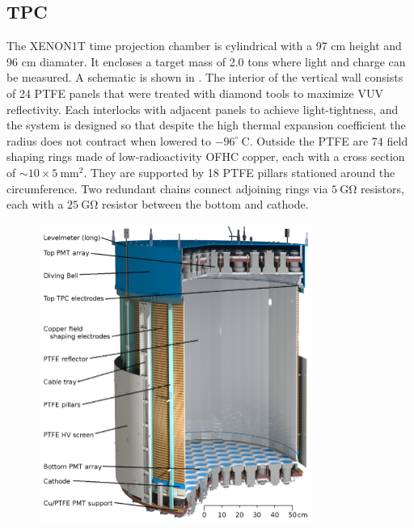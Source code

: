 \subsection{TPC}
\label{subsec:xenon1t_tpc}
The XENON1T time projection chamber is cylindrical with a 97 cm height and 96 cm diamater.  It encloses a target mass of 2.0 tons where
light and charge can be measured.  A schematic is shown in .  The interior of the vertical wall consists of 24
PTFE panels that were treated with diamond tools to
maximize VUV reflectivity.  Each interlocks with adjacent panels to achieve light-tightness, and the system is designed so that despite
the high thermal expansion coefficient the radius does not contract when lowered to $-96^{\circ}\ \mathrm{C}$.  Outside the PTFE are 74
field shaping rings made of low-radioactivity OFHC copper, each with a cross section of ${\sim} 10 \times 5\ \mathrm{mm^{2}}$.  They are
supported by 18 PTFE pillars stationed around the circumference.  Two redundant
chains connect adjoining rings via $5\ \mathrm{G \Omega}$ resistors, each with a $25\ \mathrm{G \Omega}$ resistor between the bottom and
cathode.

\begin{figure}
\centering
\includegraphics[width=0.8\textwidth]{XENON1TTPC}
\label{fig:xenon1t_tpc_tpc}
\end{figure}

